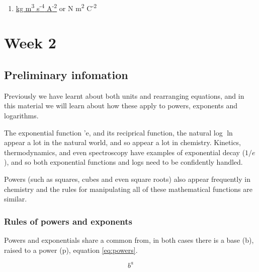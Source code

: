 \documentclass[
]{book}
\providecommand{\tightlist}{%
  \setlength{\itemsep}{0pt}\setlength{\parskip}{0pt}}
\begin{document}
\begin{enumerate}
\def\labelenumi{\arabic{enumi}.}
\setcounter{enumi}{3}
\tightlist
\item
  \href{https://www.youtube.com/embed/DsxrbDyCjTU}{kg m\textsuperscript{3} s\textsuperscript{-4} A\textsuperscript{-2}} or N m\textsuperscript{2} C\textsuperscript{-2}
\end{enumerate}

\hypertarget{ch:Workshop2}{%
\chapter{Week 2}\label{ch:Workshop2}}

\hypertarget{sec:Prelim2}{%
\section{Preliminary infomation}\label{sec:Prelim2}}

Previously we have learnt about both units and rearranging equations, and in this material we will learn about how these apply to powers, exponents and logarithms.

The exponential function '\(\textrm{e}\), and its reciprical function, the natural log \(\ln\) appear a lot in the natural world, and so appear a lot in chemistry. Kinetics, thermodynamics, and even spectroscopy have examples of exponential decay (\(1/e\)), and so both exponential functions and logs need to be confidently handled.

Powers (such as squares, cubes and even square roots) also appear frequently in chemistry and the rules for manipulating all of these mathematical functions are similar.

\hypertarget{sec:rulespowers}{%
\subsection{Rules of powers and exponents}\label{sec:rulespowers}}

Powers and exponentials share a common from, in both cases there is a base (b), raised to a power (p), equation \eqref{eq:powers}.

\begin{equation}
b^a
\label{eq:powers}
\end{equation}
\end{document}
